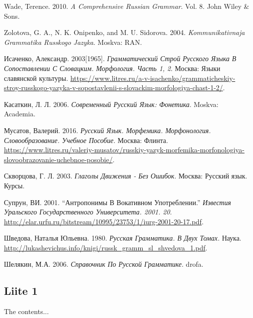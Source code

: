 \documentclass[]{scrreprt}
\begin{document}
Wade, Terence. 2010. \emph{A Comprehensive Russian Grammar}. Vol. 8.
John Wiley \& Sons. \\

Zolotova, G. A., N. K. Onipenko, and M. U. Sidorova. 2004.
\emph{Kommunikativnaja Grammatika Russkogo Jazyka}. Moskva: RAN. \\

Исаченко, Александр. 2003{[}1965{]}. \emph{Грамматический Строй Русского
Языка В Сопоставлении С Словацким. Морфология. Часть 1, 2}. Москва:
Языки славянской культуры.
\url{https://www.litres.ru/a-v-isachenko/grammaticheskiy-stroy-russkogo-yazyka-v-sopostavlenii-s-slovackim-morfologiya-chast-1-2/}. \\

Касаткин, Л. Л. 2006. \emph{Современный Русский Язык: Фонетика}. Moskva:
Academia. \\

Мусатов, Валерий. 2016. \emph{Русский Язык. Морфемика. Морфонология.
Словообразование. Учебное Пособие}. Москва: Флинта.
\url{https://www.litres.ru/valeriy-musatov/russkiy-yazyk-morfemika-morfonologiya-slovoobrazovanie-uchebnoe-posobie/}. \\

Скворцова, Г. Л. 2003. \emph{Глаголы Движения - Без Ошибок}. Москва:
Русский язык. Курсы. \\

Супрун, ВИ. 2001. ``Антропонимы В Вокативном Употреблении.''
\emph{Известия Уральского Государственного Университета. 2001. 20}.
\url{http://elar.urfu.ru/bitstream/10995/23753/1/iurg-2001-20-17.pdf}. \\

Шведова, Наталья Юльевна. 1980. \emph{Русская Грамматика. В Двух Томах.}
Наука.
\url{http://lukashevichus.info/knigi/russk_gramm_sl_shvedova_1.pdf}. \\

Шелякин, М.А. 2006. \emph{Справочник По Русской Грамматике}. drofa. \\



\begin{appendices}
\chapter{Liite 1}
The contents...
\end{appendices}
\end{document}

